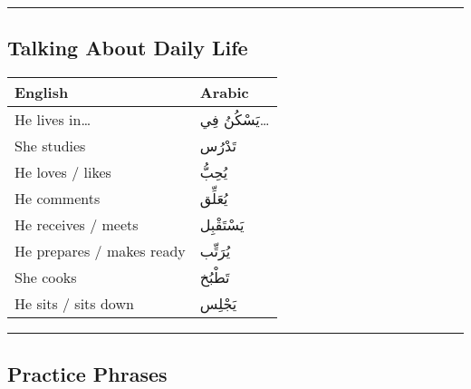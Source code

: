 \documentclass[
  a4paper,
  DIV=11,
  numbers=noendperiod]{scrartcl}
\begin{document}
\begin{center}\rule{0.5\linewidth}{0.5pt}\end{center}

\subsection{Talking About Daily Life}\label{talking-about-daily-life}

\begin{longtable}[]{@{}ll@{}}
\toprule\noalign{}
English & Arabic \\
\midrule\noalign{}
\endhead
\bottomrule\noalign{}
\endlastfoot
He lives in\ldots{} & يَسْكُنُ فِي\ldots{} \\
She studies & تَدْرُس \\
He loves / likes & يُحِبُّ \\
He comments & يُعَلِّق \\
He receives / meets & يَسْتَقْبِل \\
He prepares / makes ready & يُرَتِّب \\
She cooks & تَطْبُخ \\
He sits / sits down & يَجْلِس \\
\end{longtable}

\begin{center}\rule{0.5\linewidth}{0.5pt}\end{center}

\subsection{Practice Phrases}\label{practice-phrases}
\end{document}
